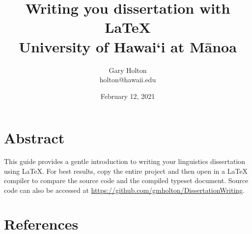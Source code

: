 \documentclass[12pt,oneside]{book}
\title{ { Writing you dissertation with \LaTeX } 
\\ {\large University of Hawai‘i at Mānoa} }
\author{ Gary Holton \\ holton@hawaii.edu}
\date{February 12, 2021}
\begin{document}
\maketitle
\frontmatter

\chapter{Abstract}
This guide provides a gentle introduction to writing your linguistics dissertation using \LaTeX. For best results, copy the entire project and then open in a {\LaTeX} compiler to compare the source code and the compiled typeset document.  Source code can also be accessed at \url{https://github.com/gmholton/DissertationWriting}.





\tableofcontents
\listoffigures
\listoftables

\mainmatter





% 


\chapter*{References}




\end{document}
